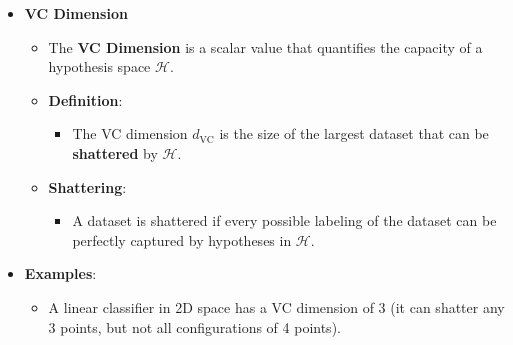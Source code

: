 \documentclass[
  ignorenonframetext,
]{beamer}
\providecommand{\tightlist}{%
  \setlength{\itemsep}{0pt}\setlength{\parskip}{0pt}}\usepackage{longtable,booktabs,array}
\begin{document}
\begin{frame}
\begin{itemize}
\tightlist
\item
  \textbf{VC Dimension}

  \begin{itemize}
  \tightlist
  \item
    The \textbf{VC Dimension} is a scalar value that quantifies the
    capacity of a hypothesis space \(\mathcal{H}\).
  \item
    \textbf{Definition}:

    \begin{itemize}
    \tightlist
    \item
      The VC dimension \(d_{\text{VC}}\) is the size of the largest
      dataset that can be \textbf{shattered} by \(\mathcal{H}\).
    \end{itemize}
  \item
    \textbf{Shattering}:

    \begin{itemize}
    \tightlist
    \item
      A dataset is shattered if every possible labeling of the dataset
      can be perfectly captured by hypotheses in \(\mathcal{H}\).
    \end{itemize}
  \end{itemize}
\item
  \textbf{Examples}:

  \begin{itemize}
  \tightlist
  \item
    A linear classifier in 2D space has a VC dimension of 3 (it can
    shatter any 3 points, but not all configurations of 4 points).
  \end{itemize}
\end{itemize}
\end{frame}
\end{document}
